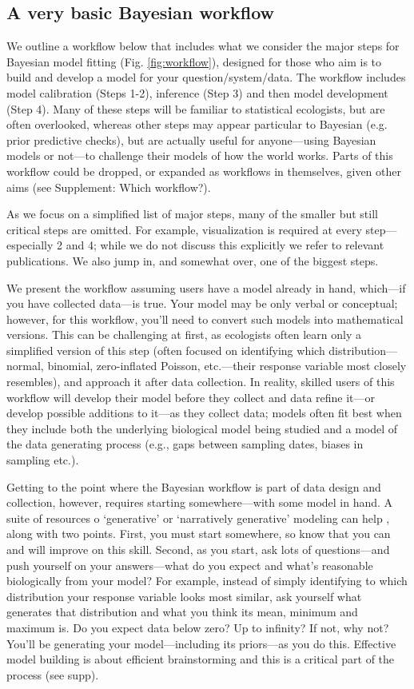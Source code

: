 \documentclass[11pt]{article}
\begin{document}
{\subsection{A very basic Bayesian workflow}

We outline a workflow below that includes what we consider the major steps for Bayesian model fitting (Fig. \ref{fig:workflow}), designed for those who aim is to build and develop a model for
your question/system/data. The workflow includes model calibration (Steps 1-2), inference (Step 3) and then model development (Step 4). Many of these steps will be familiar to statistical ecologists, but are often overlooked, whereas other steps may appear particular to Bayesian (e.g. prior predictive checks), but are actually useful for anyone---using Bayesian models or not---to challenge their models of how the world works. Parts of this workflow could be dropped, or expanded as workflows in themselves, given other aims (see Supplement: Which workflow?). 

As we focus on a simplified list of major steps, many of the smaller but still critical steps are omitted. For example, visualization is required at every step---especially 2 and 4; while we do not discuss this explicitly we refer to relevant publications. We also jump in, and somewhat over, one of the biggest steps. 

We present the workflow assuming users have a model already in hand, which---if you have collected data---is true. Your model may be only verbal or conceptual; however, for this workflow, you'll need to convert such models into mathematical versions. This can be challenging at first, as ecologists often learn only a simplified version of this step (often focused on identifying which distribution---normal, binomial, zero-inflated Poisson, etc.---their response variable most closely resembles), and approach it after data collection. In reality, skilled users of this workflow will develop their model before they collect and data refine it---or develop possible additions to it---as they collect data; models often fit best when they include both the underlying biological model being studied and a model of the data generating process (e.g., gaps between sampling dates, biases in sampling etc.). 

Getting to the point where the Bayesian workflow is part of data design and collection, however, requires starting somewhere---with some model in hand. A suite of resources o `generative' or `narratively generative' modeling can help \citep{statrethink,betangen}, along with two points. First, you must start somewhere, so know that you can and will improve on this skill. Second, as you start, ask lots of questions---and push yourself on your answers---what do you expect and what's reasonable biologically from your model? For example, instead of simply identifying to which distribution your response variable looks most similar, ask yourself what generates that distribution and what you think its mean, minimum and maximum is. Do you expect data below zero? Up to infinity? If not, why not? You'll be generating your model---including its priors---as you do this. Effective model building is about efficient brainstorming and this is a critical part of the process (see supp). 

}
\end{document}

